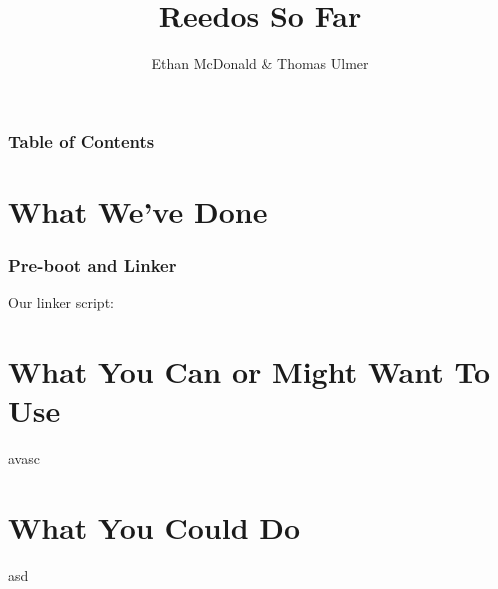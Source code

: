 \documentclass{beamer}
\author{Ethan McDonald \& Thomas Ulmer}
\title{Reedos So Far}
\begin{document}
\begin{frame}
  \maketitle
\end{frame}

\begin{frame}
  \frametitle{Table of Contents}
  \tableofcontents
\end{frame}

\section{What We've Done}

\begin{frame}
  \frametitle{Pre-boot and Linker}

  \begin{minipage}{0.5\textwidth}
    Our linker script:

  \end{minipage}
  \begin{minipage}{0.5\textwidth}
  \end{minipage}

\end{frame}

\section{What You Can or Might Want To Use}

\begin{frame}
  avasc
\end{frame}

\section{What You Could Do}
\begin{frame}

asd
\end{frame}
\end{document}
